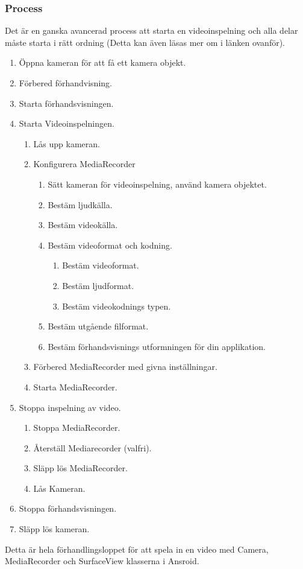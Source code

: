 \subsubsection{Process}
Det är en ganska avancerad process att starta en videoinspelning och alla delar måste starta i rätt ordning (Detta kan även läsas mer om i länken ovanför).
\begin{enumerate}
\item Öppna kameran för att få ett kamera objekt.
\item Förbered förhandvisning.
\item Starta förhandsvisningen.
\item Starta Videoinspelningen.
	\begin{enumerate}
		\item Lås upp kameran.
		\item Konfigurera MediaRecorder
		\begin{enumerate}
			\item Sätt kameran för videoinspelning, använd kamera objektet.
			\item Bestäm ljudkälla.
			\item Bestäm videokälla.
			\item Bestäm videoformat och kodning.
			\begin{enumerate}
				\item Bestäm videoformat.
				\item Bestäm ljudformat.
				\item Bestäm videokodnings typen.
			\end{enumerate}
			\item Bestäm utgående filformat.
			\item Bestäm förhandsvisnings utformningen för din applikation.
		\end{enumerate}
		\item Förbered MediaRecorder med givna inställningar.
		\item Starta MediaRecorder.
	\end{enumerate}
	\item Stoppa inspelning av video.
	\begin{enumerate}
		\item Stoppa MediaRecorder.
		\item Återställ Mediarecorder (valfri).
		\item Släpp lös MediaRecorder.
		\item Lås Kameran.
	\end{enumerate}
	\item Stoppa förhandsvisningen.
	\item Släpp lös kameran.
\end{enumerate}
Detta är hela förhandlingsloppet för att spela in en video med Camera, MediaRecorder och SurfaceView klasserna i Ansroid.

